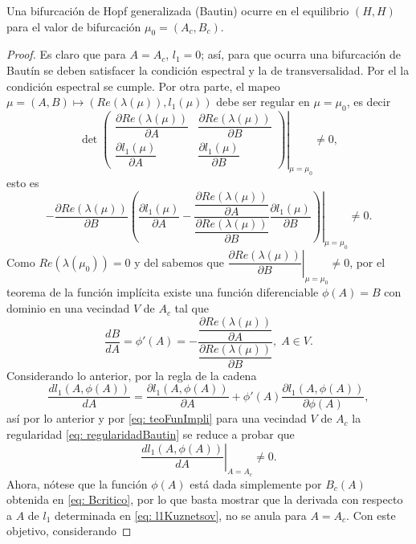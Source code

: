 \begin{teo}
	Una bifurcación de Hopf generalizada (Bautin) ocurre en el equilibrio $(H, H)$ para el valor de bifurcación $\mu_0=(A_c, B_c)$.
\end{teo}
\begin{proof}
	Es claro que para $A= A_c$, $l_1 = 0$; así, para que ocurra una bifurcación de Bautín se deben satisfacer la condición espectral y la de transversalidad. Por el  la condición espectral se cumple. Por otra parte, el mapeo $\mu = (A,B) \longmapsto \left(Re(\lambda(\mu)), l_1(\mu)\right)$ debe ser regular en $\mu=\mu_0$, es decir
	\begin{equation*}
		\det \left. \begin{pmatrix}
			\dfrac{\partial Re(\lambda(\mu))}{\partial A} & \dfrac{\partial Re(\lambda(\mu))}{\partial B} \\[6pt]
			\dfrac{\partial l_1(\mu)}{\partial A} & \dfrac{\partial l_1(\mu)}{\partial B} 
		\end{pmatrix} \right|_{\mu=\mu_0} \neq 0,
	\end{equation*}
	esto es
	\begin{equation}
		\left. - \dfrac{\partial Re(\lambda(\mu))}{\partial B} \left( \dfrac{\partial l_1(\mu)}{\partial A} - \dfrac{\dfrac{\partial Re(\lambda(\mu))}{\partial A}}{\dfrac{\partial Re(\lambda(\mu))}{\partial B}} \dfrac{\partial l_1(\mu)}{\partial B} \right) \right|_{\mu=\mu_0} \neq 0.
		\label{eq: regularidadBautin}
	\end{equation}
	Como $Re(\lambda(\mu_0))=0$ y del  sabemos que \linebreak $\left. \dfrac{\partial Re(\lambda(\mu))}{\partial B} \right|_{\mu=\mu_0} \neq 0$, por el teorema de la función implícita existe una función diferenciable $\phi(A)=B$ con dominio en una vecindad $V$ de $A_c$ tal que
	\begin{equation}
		\dfrac{dB}{dA}=\phi'(A)= - \dfrac{\dfrac{\partial Re(\lambda(\mu))}{\partial A}}{\dfrac{\partial Re(\lambda(\mu))}{\partial B}}, \; A \in V.
		\label{eq: teoFunImpli}
	\end{equation}
	Considerando lo anterior, por la regla de la cadena $$\dfrac{d l_1(A, \phi(A))}{dA} = \dfrac{\partial l_1(A, \phi(A))}{\partial A} + \phi'(A) \dfrac{\partial l_1(A, \phi(A))}{\partial \phi(A)},$$ así por lo anterior y por \eqref{eq: teoFunImpli} para una vecindad $V$ de $A_c$ la regularidad \eqref{eq: regularidadBautin} se reduce a probar que $$\left. \dfrac{d l_1(A, \phi(A))}{dA} \right|_{A=A_c} \neq 0.$$ Ahora, nótese que la función $\phi(A)$ está dada simplemente por $B_c(A)$ obtenida en \eqref{eq: Bcritico}, por lo que basta mostrar que la derivada con respecto a $A$ de $l_1$ determinada en \eqref{eq: l1Kuznetsov}, no se anula para $A=A_c$. Con este objetivo, considerando

\end{proof}
